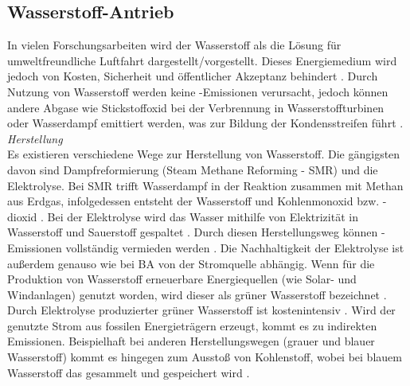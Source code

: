 \subsection{Wasserstoff-Antrieb}
\label{Wasserstoff-Antrieb}

In vielen Forschungsarbeiten wird der Wasserstoff als die Lösung für umweltfreundliche Luftfahrt dargestellt/vorgestellt.
Dieses Energiemedium wird jedoch von Kosten, Sicherheit und öffentlicher Akzeptanz behindert \cite{ansell2023review}.
Durch Nutzung von Wasserstoff werden keine -Emissionen verursacht, jedoch können andere Abgase 
wie Stickstoffoxid  bei der Verbrennung in Wasserstoffturbinen oder Wasserdampf emittiert werden, was zur Bildung der Kondensstreifen
führt \cite{hepperle2012electric}.\\
%
\textit{Herstellung}\\
Es existieren verschiedene Wege zur Herstellung von Wasserstoff. 
Die gängigsten davon sind Dampfreformierung (Steam Methane Reforming - SMR) und die Elektrolyse. %
Bei SMR trifft Wasserdampf in der Reaktion zusammen mit Methan aus Erdgas, infolgedessen entsteht der
Wasserstoff  und Kohlenmonoxid  bzw. -dioxid \cite{mulder2019outlook}. Bei der Elektrolyse wird das Wasser mithilfe von Elektrizität 
in Wasserstoff  und Sauerstoff  gespaltet \cite{mulder2019outlook}. Durch diesen Herstellungsweg können -Emissionen 
vollständig vermieden werden \cite{dalmia2022powering}. 
Die Nachhaltigkeit der Elektrolyse ist außerdem genauso wie bei BA von der Stromquelle abhängig.
%
Wenn für die Produktion von Wasserstoff erneuerbare Energiequellen (wie Solar- und Windanlagen) genutzt worden, 
wird dieser als grüner Wasserstoff bezeichnet \cite{mulder2019outlook}. 
Durch Elektrolyse produzierter grüner Wasserstoff ist kostenintensiv \cite{dalmia2022powering}.
Wird der genutzte Strom aus fossilen Energieträgern erzeugt, kommt es zu indirekten Emissionen.
Beispielhaft bei anderen Herstellungswegen (grauer und blauer Wasserstoff)
kommt es hingegen zum Ausstoß von Kohlenstoff, wobei bei blauem Wasserstoff das  gesammelt und gespeichert wird \cite{mulder2019outlook}.

